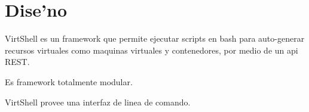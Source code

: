 \section{Dise'no}
\label{disenoapi}

VirtShell es un framework que permite ejecutar scripts en bash para auto-generar recursos virtuales como maquinas virtuales y contenedores, por medio de un api REST. 

Es framework totalmente modular.


VirtShell provee una interfaz de linea de comando.

